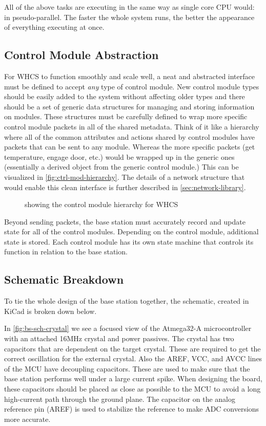 \documentclass[draft,twocolumn,letterpaper,10pt]{IEEEtran}
\newcommand{\ucffig}[3]{
\begin{figure}[h]
\centering
\makebox[\linewidth][c]{
#2
}
\caption{#3}
\label{#1}
\end{figure}
}
\newcommand{\ucfgfx}[4][scale=1.0]{
\ucffig{#2}{\texttt{[image: \#3]}}{#4}
}
\begin{document}
All of the above tasks are executing in the same way as single core CPU
would: in pseudo-parallel. The faster the whole system runs, the better the
appearance of everything executing at once.

\subsection{Control Module Abstraction}
For WHCS to function smoothly and scale well, a neat and abstracted interface
must be defined to accept \emph{any} type of control module. New control module
types should be easily added to the system without affecting older types and
there should be a set of generic data structures for managing and storing
information on modules. These structures must be carefully defined to wrap more
specific control module packets in all of the shared metadata. Think of it like
a hierarchy where all of the common attributes and actions shared by control
modules have packets that can be sent to any module. Whereas the more specific
packets (get temperature, engage door, etc.) would be wrapped up in the generic
ones (essentially a derived object from the generic control module.) This can
be visualized in \autoref{fig:ctrl-mod-hierarchy}. The
details of a network structure that would enable this clean interface is
further described in \autoref{sec:network-library}.

\ucfgfx[width=\linewidth]{fig:ctrl-mod-hierarchy}{control-module-hierarchy}{showing the control
module hierarchy for WHCS}

Beyond sending packets, the base station must accurately record and update
state for all of the control modules. Depending on the control module,
additional state is stored. Each control module has its own state machine that
controls its function in relation to the base station.

\subsection{Schematic Breakdown}
To tie the whole design of the base station together, the schematic, created in
KiCad is broken down below.

In \autoref{fig:bs-sch-crystal} we see a focused view of the Atmega32-A
microcontroller with an attached 16MHz crystal and power passives. The crystal
has two capacitors that are dependent on the target crystal. These are required
to get the correct oscillation for the external crystal. Also the AREF, VCC,
and AVCC lines of the MCU have decoupling capacitors. These are used to make
sure that the base station performs well under a large current spike. When
designing the board, these capacitors should be placed as close as possible to
the MCU to avoid a long high-current path through the ground plane. The
capacitor on the analog reference pin (AREF) is used to stabilize the reference
to make ADC conversions more accurate.
\end{document}
